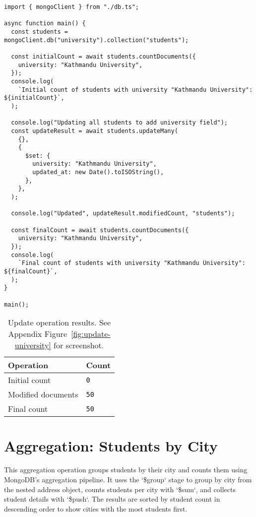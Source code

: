\begin{verbatim}
import { mongoClient } from "./db.ts";

async function main() {
  const students = mongoClient.db("university").collection("students");

  const initialCount = await students.countDocuments({
    university: "Kathmandu University",
  });
  console.log(
    `Initial count of students with university "Kathmandu University": ${initialCount}`,
  );

  console.log("Updating all students to add university field");
  const updateResult = await students.updateMany(
    {},
    {
      $set: {
        university: "Kathmandu University",
        updated_at: new Date().toISOString(),
      },
    },
  );

  console.log("Updated", updateResult.modifiedCount, "students");

  const finalCount = await students.countDocuments({
    university: "Kathmandu University",
  });
  console.log(
    `Final count of students with university "Kathmandu University": ${finalCount}`,
  );
}

main();
\end{verbatim}

\begin{table}[H]
  \centering
  \begin{tabular}{|l|l|}
    \hline
    \textbf{Operation} & \textbf{Count} \\
    \hline
    Initial count      & \texttt{0}              \\
    Modified documents & \texttt{50}             \\
    Final count        & \texttt{50}             \\
    \hline
  \end{tabular}
  \caption{Update operation results. See Appendix Figure~\ref{fig:update-university} for screenshot.}
\end{table}

\section{Aggregation: Students by City}
This aggregation operation groups students by their city and counts them using MongoDB's aggregation pipeline. It uses the `\$group` stage to group by city from the nested address object, counts students per city with `\$sum`, and collects student details with `\$push`. The results are sorted by student count in descending order to show cities with the most students first.

